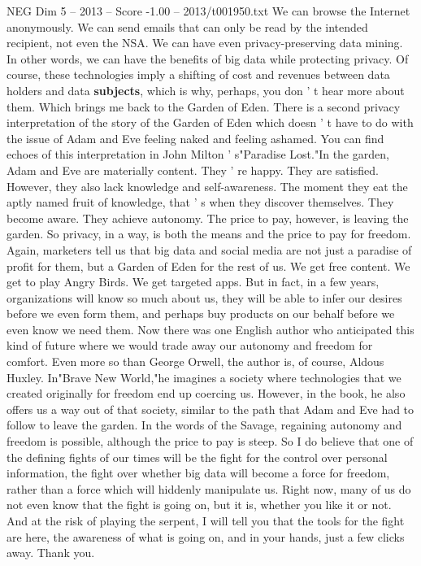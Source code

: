 \begin{textsample}{NEG Dim 5 – 2013 – Score -1.00 – 2013/t001950.txt}
We can browse the Internet anonymously.
We can send emails that can only be read by the intended recipient, not even the NSA.
We can have even privacy-preserving data mining.
In other words, we can have the benefits of big data while protecting privacy.
Of course, these technologies imply a shifting of cost and revenues between data holders and data \textbf{subjects}, which is why, perhaps, you don ' t hear more about them.
Which brings me back to the Garden of Eden.
There is a second privacy interpretation of the story of the Garden of Eden which doesn ' t have to do with the issue of Adam and Eve feeling naked and feeling ashamed.
You can find echoes of this interpretation in John Milton ' s"Paradise Lost."In the garden, Adam and Eve are materially content.
They ' re happy.
They are satisfied.
However, they also lack knowledge and self-awareness.
The moment they eat the aptly named fruit of knowledge, that ' s when they discover themselves.
They become aware.
They achieve autonomy.
The price to pay, however, is leaving the garden.
So privacy, in a way, is both the means and the price to pay for freedom.
Again, marketers tell us that big data and social media are not just a paradise of profit for them, but a Garden of Eden for the rest of us.
We get free content.
We get to play Angry Birds.
We get targeted apps.
But in fact, in a few years, organizations will know so much about us, they will be able to infer our desires before we even form them, and perhaps buy products on our behalf before we even know we need them.
Now there was one English author who anticipated this kind of future where we would trade away our autonomy and freedom for comfort.
Even more so than George Orwell, the author is, of course, Aldous Huxley.
In"Brave New World,"he imagines a society where technologies that we created originally for freedom end up coercing us.
However, in the book, he also offers us a way out of that society, similar to the path that Adam and Eve had to follow to leave the garden.
In the words of the Savage, regaining autonomy and freedom is possible, although the price to pay is steep.
So I do believe that one of the defining fights of our times will be the fight for the control over personal information, the fight over whether big data will become a force for freedom, rather than a force which will hiddenly manipulate us.
Right now, many of us do not even know that the fight is going on, but it is, whether you like it or not.
And at the risk of playing the serpent, I will tell you that the tools for the fight are here, the awareness of what is going on, and in your hands, just a few clicks away.
Thank you.

\end{textsample}
